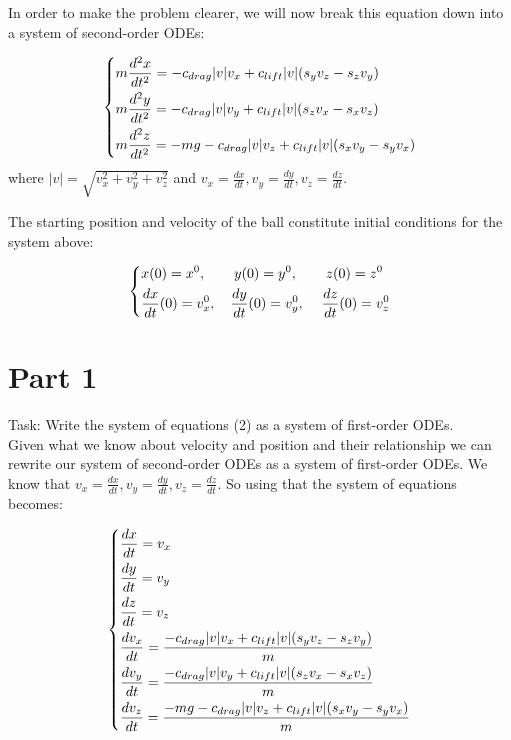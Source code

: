 \documentclass[12pt]{article}
\begin{document}
In order to make the problem clearer, we will now break this equation down into a system of second-order ODEs:

\begin{equation}
\begin{dcases}
m\frac{d^{2}x}{dt^{2}} = -c_{drag}|v|v_{x} + c_{lift}|v|(s_{y}v_{z} - s_{z}v_{y})\\ 
m\frac{d^{2}y}{dt^{2}} = -c_{drag}|v|v_{y} + c_{lift}|v|(s_{z}v_{x} - s_{x}v_{z})\\
m\frac{d^{2}z}{dt^{2}} = -mg -c_{drag}|v|v_{z} + c_{lift}|v|(s_{x}v_{y} - s_{y}v_{x})
\end{dcases}
\end{equation}
where $|v| = \sqrt{v_{x}^{2} + v_{y}^{2} + v_{z}^{2}}$ and $v_{x} = \frac{dx}{dt}, v_{y} = \frac{dy}{dt}, v_{z} = \frac{dz}{dt}$.

The starting position and velocity of the ball constitute initial conditions for the system above:

\begin{equation}
\begin{dcases}
x(0) = x^{0}, \hspace{.7cm}y(0) = y^{0}, \hspace{.7cm}z(0) = z^{0}\\
\frac{dx}{dt}(0) = v_{x}^{0}, \hspace{.35cm}\frac{dy}{dt}(0) = v_{y}^{0}, \hspace{.42cm}\frac{dz}{dt}(0) = v_{z}^{0}
\end{dcases}
\end{equation}


\section*{Part 1}\label{sec::Part 1}
\noindent Task: Write the system of equations (2) as a system of first-order ODEs.\\

Given what we know about velocity and position and their relationship we can rewrite our system of second-order ODEs as a system of first-order ODEs. We know that $v_{x} = \frac{dx}{dt}, v_{y} = \frac{dy}{dt}, v_{z} = \frac{dz}{dt}$. So using that the system of equations becomes:

\begin{equation}
\begin{dcases}
\frac{dx}{dt} = v_{x}\\
\frac{dy}{dt} = v_{y}\\
\frac{dz}{dt} = v_{z}\\
\frac{dv_{x}}{dt} = \frac{-c_{drag}|v|v_{x} + c_{lift}|v|(s_{y}v_{z} - s_{z}v_{y})}{m}\\ 
\frac{dv_{y}}{dt} = \frac{-c_{drag}|v|v_{y} + c_{lift}|v|(s_{z}v_{x} - s_{x}v_{z})}{m}\\ 
\frac{dv_{z}}{dt} = \frac{-mg -c_{drag}|v|v_{z} + c_{lift}|v|(s_{x}v_{y} - s_{y}v_{x})}{m}
\end{dcases}
\end{equation}
\end{document}
